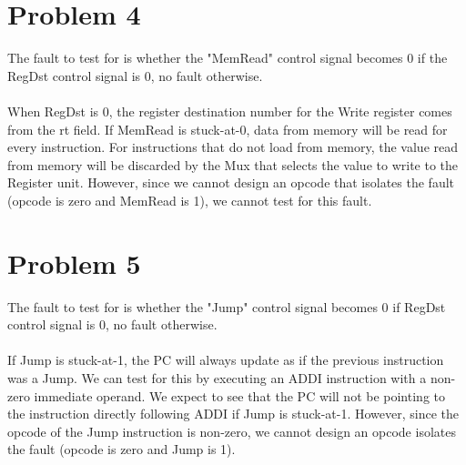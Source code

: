 \documentclass[10pt,letterpaper]{article}
\begin{document}

\section{Problem 4}
The fault to test for is whether the "MemRead" control signal becomes 0 if the RegDst control signal is 0, no fault otherwise.\\\\
When RegDst is 0, the register destination number for the Write register comes from the rt field. If MemRead is stuck-at-0, data from memory will be read for every instruction. For instructions that do not load from memory, the value read from memory will be discarded by the Mux that selects the value to write to the Register unit. However, since we cannot design an opcode that isolates the fault (opcode is zero and MemRead is 1), we cannot test for this fault.


\section{Problem 5}
The fault to test for is whether the "Jump" control signal becomes 0 if RegDst control signal is 0, no fault otherwise.\\\\
If Jump is stuck-at-1, the PC will always update as if the previous instruction was a Jump. We can test for this by executing an ADDI instruction with a non-zero immediate operand. We expect to see that the PC will not be pointing to the instruction directly following ADDI if Jump is stuck-at-1. However, since the opcode of the Jump instruction is non-zero, we cannot design an opcode isolates the fault (opcode is zero and Jump is 1).

\pagebreak

\end{document}
